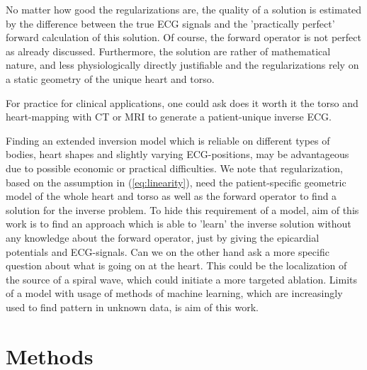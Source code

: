 No matter how good the regularizations are, the quality of a solution is estimated by the difference between the true ECG signals and the 'practically perfect' forward calculation of this solution. Of course, the forward operator is not perfect as already discussed. Furthermore, the solution are rather of mathematical nature, and less physiologically directly justifiable and the regularizations rely on a static geometry of the unique heart and torso.

For practice for clinical applications, one could ask does it worth it the torso and heart-mapping with CT or MRI to generate a patient-unique inverse ECG. 

Finding an extended inversion model which is reliable on different types of bodies, heart shapes and slightly varying ECG-positions, may be advantageous due to possible economic or practical difficulties. We note that regularization, based on the assumption in (\ref{eq:linearity}), need the patient-specific geometric model of the whole heart and torso as well as the forward operator to find a solution for the inverse problem. 
To hide this requirement of a model, aim of this work is to find an approach which is able to 'learn' the inverse solution without any knowledge about the forward operator, just by giving the epicardial potentials and ECG-signals. 
Can we on the other hand ask a more specific question about what is going on at the heart. This could be the localization of the source of a spiral wave, which could initiate a more targeted ablation. Limits of a model with usage of methods of machine learning, which are increasingly used to find pattern in unknown data, is aim of this work.

%

\section{Methods}
